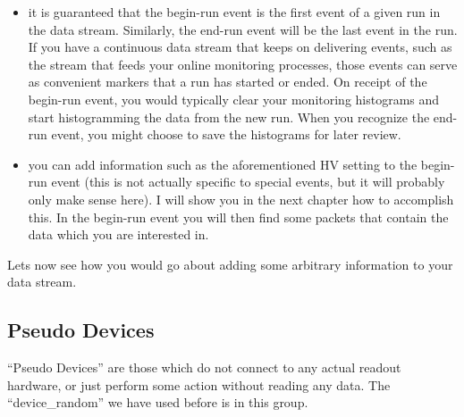 \documentclass{article}[11pt]
\begin{document}
\begin{itemize}
\item it is guaranteed that the begin-run event is the first event of
  a given run in the data stream. Similarly, the end-run event will be
  the last event in the run. If you have a continuous data stream that
  keeps on delivering events, such as the stream that feeds your
  online monitoring processes, those events can serve as convenient
  markers that a run has started or ended. On receipt of the begin-run
  event, you would typically clear your monitoring histograms and start
  histogramming the data from the new run. When you recognize the
  end-run event, you might choose to save the histograms for later
  review.

\item you can add information such as the aforementioned HV setting to
  the begin-run event (this is not actually specific to special
  events, but it will probably only make sense here). I will show you
  in the next chapter how to accomplish this. In the begin-run event
  you will then find some packets that contain the data which you are
  interested in.

\end{itemize}

Lets now see how you would go about adding some arbitrary information to your data 
stream.

\subsection{Pseudo Devices}

``Pseudo Devices'' are those which do not connect to any actual
readout hardware, or just perform some action without reading any
data.  The ``device\_random'' we have used before is in this group.
\end{document}
